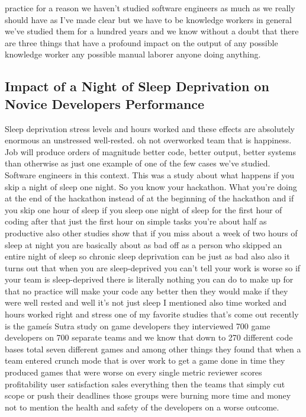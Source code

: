 \documentclass[conference, compsoc, twoside]{IEEEtran}
\begin{document}
practice for a reason we haven't studied software engineers as much as we really should have as I've made clear but we have to be knowledge workers in general we've studied them for a hundred years and we know without a doubt that there are three things that have a profound impact on the output of any possible knowledge worker any possible manual laborer anyone doing anything.

\subsection{Impact of a Night of Sleep Deprivation on Novice Developers Performance}
Sleep deprivation stress levels and hours worked and these effects are absolutely enormous an unstressed well-rested. oh not overworked team that is happiness. Job will produce orders of magnitude better code, better output, better systems than otherwise as just one example of one of the few cases we've studied.
Software engineers in this context. This was a study about what happens if you skip a night of sleep one night. 
So you know your hackathon. 
What you're doing at the end of the hackathon instead of at the beginning of the hackathon and if you skip one hour of sleep if you sleep one night of sleep for the first hour of coding after that just the first hour on simple tasks you're about half as productive also other studies show that if you miss about a week of two hours of sleep at night you are basically about as bad off as a person who skipped an entire night of sleep so chronic sleep deprivation can be just as bad also also it turns out that when you are sleep-deprived you can't tell your work is worse so if your team is sleep-deprived there is literally nothing you can do to make up for that no practice will make your code any better then they would make if they were well rested and well it's not just sleep I mentioned also time worked and hours worked right and stress one of my favorite studies that's come out recently is the gameís Sutra study on game developers they interviewed 700 game developers on 700 separate teams and we know that down to 270 different code bases total seven different games and among other things they found that when a team entered crunch mode that is over work to get a game done in time they produced games that were worse on every single metric reviewer scores profitability user satisfaction sales everything then the teams that simply cut scope or push their deadlines those groups were burning more time and money not to mention the health and safety of the developers on a worse outcome. 
\end{document}
